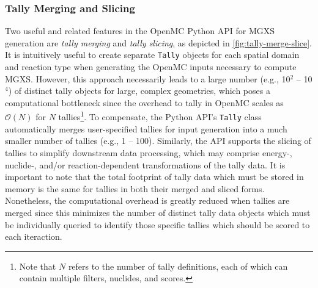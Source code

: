 \subsubsection{Tally Merging and Slicing}
\label{subsubsec:tally-slice-merge}

Two useful and related features in the OpenMC Python API for MGXS generation are \emph{tally merging} and \emph{tally slicing}, as depicted in \cref{fig:tally-merge-slice}. It is intuitively useful to create separate \texttt{Tally} objects for each spatial domain and reaction type when generating the OpenMC inputs necessary to compute MGXS. However, this approach necessarily leads to a large number (e.g., 10$^2$ -- 10$^4$) of distinct tally objects for large, complex geometries, which poses a computational bottleneck since the overhead to tally in OpenMC scales as $\mathcal{O}(N)$ for $N$ tallies\footnote{Note that $N$ refers to the number of tally definitions, each of which can contain multiple filters, nuclides, and scores.}. To compensate, the Python API's \texttt{Tally} class automatically merges user-specified tallies for input generation into a much smaller number of tallies (e.g., 1 -- 100). Similarly, the API supports the slicing of tallies to simplify downstream data processing, which may comprise energy-, nuclide-, and/or reaction-dependent transformations of the tally data. It is important to note that the total footprint of tally data which must be stored in memory is the same for tallies in both their merged and sliced forms. Nonetheless, the computational overhead is greatly reduced when tallies are merged since this minimizes the number of distinct tally data objects which must be individually queried to identify those specific tallies which should be scored to each iteraction.

